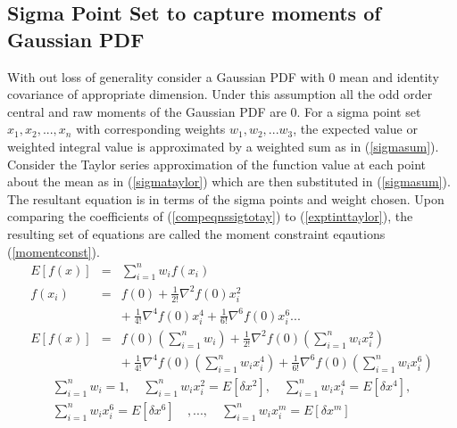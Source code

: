 \documentclass[letterpaper, 10 pt, conference]{ieeeconf}  %
\begin{document}
\subsection{Sigma Point Set to capture moments of Gaussian PDF}
With out loss of generality consider a Gaussian PDF with $0$ mean and identity covariance of appropriate dimension. Under this assumption all the odd order central and raw moments of the Gaussian PDF are 0. For a sigma point set $x_1,x_2,...,x_n$ with corresponding weights $w_1,w_2,...w_3$, the expected value or weighted integral value is approximated by a weighted sum as in (\ref{sigmasum}). Consider the Taylor series approximation of the function value at each point about the mean as in (\ref{sigmataylor}) which are then substituted in (\ref{sigmasum}). The resultant equation is in terms of the sigma points and weight chosen. Upon comparing the coefficients of (\ref{compeqnssigtotay}) to (\ref{exptinttaylor}), the resulting set of equations are called the moment constraint eqautions (\ref{momentconst}).   
\setlength{\arraycolsep}{0.0em}
\begin{eqnarray}
E[f(x)]&{}={}& \sum_{i=1}^n{w_if(x_i)}\label{sigmasum}\\
f(x_i)&{}={}& f(0)+\frac{1}{2!}\nabla^2f(0)x_i^2\nonumber \\ 
&&{+}\: \frac{1}{4!}\nabla^4f(0)x_i^4+\frac{1}{6!}\nabla^6f(0)x_i^6... \label{sigmataylor}\\
E[f(x)]&{}={}& f(0)(\sum_{i=1}^n{w_i})+\frac{1}{2!}\nabla^2f(0)(\sum_{i=1}^n{w_ix_i^2})\nonumber\\
&&{+}\: \frac{1}{4!}\nabla^4f(0)(\sum_{i=1}^n{w_ix_i^4})+\frac{1}{6!}\nabla^6f(0)(\sum_{i=1}^n{w_ix_i^6}) \label{compeqnssigtotay}
\end{eqnarray}
\setlength{\arraycolsep}{5pt} 
\setlength{\arraycolsep}{0.0em}
\begin{eqnarray}
\sum_{i=1}^n{w_i}=1, \quad  \sum_{i=1}^n{w_ix_i^2}=E[\delta{x}^2], \quad \sum_{i=1}^n{w_ix_i^4}=E[\delta{x}^4], \nonumber\\
\sum_{i=1}^n{w_ix_i^6}=E[\delta{x}^6]\quad,..., \quad \sum_{i=1}^n{w_ix_i^m}=E[\delta{x}^m]\label{momentconst}
\end{eqnarray}
\setlength{\arraycolsep}{5pt}        
\end{document}
